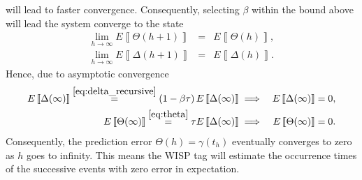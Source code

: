 \documentclass[journal,draftcls,onecolumn,12pt,twoside]{IEEEtranTCOM}
\newcommand{\expected}[1]{E\left\llbracket #1 \right\rrbracket}
\begin{document}
will lead to faster convergence. 
Consequently, selecting $\beta$ within the bound above will lead the system  
converge to the state  
\begin{eqnarray}
\underset{h\rightarrow\infty}{\lim}\expected{\Theta(h+1)} &=&
\expected{\Theta(h)}, \label{eq:asymp_theta} \\
\underset{h\rightarrow\infty}{\lim}\expected{\Delta(h+1)}&=&
\expected{\Delta(h)} \label{eq:asymp_delta}.
\end{eqnarray}
Hence, due to asymptotic convergence
\begin{eqnarray}
\expected{\Delta(\infty)} \overset{\eqref{eq:delta_recursive}}{=} 
\left(1-\beta 
\tau\right)\expected{\Delta(\infty)} &\implies& \expected{\Delta(\infty)}=0, 
\label{eq:delta_convergence}\\
\expected{\Theta(\infty)}  \overset{\eqref{eq:theta}}{=} 
\tau\expected{\Delta(\infty)}&\implies&\expected{\Theta(\infty)}=0. 
\label{eq:expected_error}
\end{eqnarray}
Consequently, the prediction error $\Theta(h)=\gamma(t_h)$ 
eventually converges to zero as $h$ goes to infinity. This means the WISP tag 
will estimate the occurrence times of the successive
events with zero error in expectation. 
\end{document}
